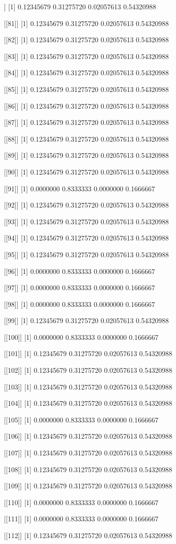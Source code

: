 \documentclass{article}
\begin{document}
\begin{Schunk}
\begin{Soutput}
[[80]]
[1] 0.12345679 0.31275720 0.02057613 0.54320988

[[81]]
[1] 0.12345679 0.31275720 0.02057613 0.54320988

[[82]]
[1] 0.12345679 0.31275720 0.02057613 0.54320988

[[83]]
[1] 0.12345679 0.31275720 0.02057613 0.54320988

[[84]]
[1] 0.12345679 0.31275720 0.02057613 0.54320988

[[85]]
[1] 0.12345679 0.31275720 0.02057613 0.54320988

[[86]]
[1] 0.12345679 0.31275720 0.02057613 0.54320988

[[87]]
[1] 0.12345679 0.31275720 0.02057613 0.54320988

[[88]]
[1] 0.12345679 0.31275720 0.02057613 0.54320988

[[89]]
[1] 0.12345679 0.31275720 0.02057613 0.54320988

[[90]]
[1] 0.12345679 0.31275720 0.02057613 0.54320988

[[91]]
[1] 0.0000000 0.8333333 0.0000000 0.1666667

[[92]]
[1] 0.12345679 0.31275720 0.02057613 0.54320988

[[93]]
[1] 0.12345679 0.31275720 0.02057613 0.54320988

[[94]]
[1] 0.12345679 0.31275720 0.02057613 0.54320988

[[95]]
[1] 0.12345679 0.31275720 0.02057613 0.54320988

[[96]]
[1] 0.0000000 0.8333333 0.0000000 0.1666667

[[97]]
[1] 0.0000000 0.8333333 0.0000000 0.1666667

[[98]]
[1] 0.0000000 0.8333333 0.0000000 0.1666667

[[99]]
[1] 0.12345679 0.31275720 0.02057613 0.54320988

[[100]]
[1] 0.0000000 0.8333333 0.0000000 0.1666667

[[101]]
[1] 0.12345679 0.31275720 0.02057613 0.54320988

[[102]]
[1] 0.12345679 0.31275720 0.02057613 0.54320988

[[103]]
[1] 0.12345679 0.31275720 0.02057613 0.54320988

[[104]]
[1] 0.12345679 0.31275720 0.02057613 0.54320988

[[105]]
[1] 0.0000000 0.8333333 0.0000000 0.1666667

[[106]]
[1] 0.12345679 0.31275720 0.02057613 0.54320988

[[107]]
[1] 0.12345679 0.31275720 0.02057613 0.54320988

[[108]]
[1] 0.12345679 0.31275720 0.02057613 0.54320988

[[109]]
[1] 0.12345679 0.31275720 0.02057613 0.54320988

[[110]]
[1] 0.0000000 0.8333333 0.0000000 0.1666667

[[111]]
[1] 0.0000000 0.8333333 0.0000000 0.1666667

[[112]]
[1] 0.12345679 0.31275720 0.02057613 0.54320988
\end{Soutput}
\end{Schunk}
\end{document}

